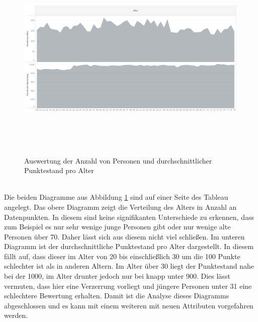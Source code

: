 \begin{onehalfspace}
\begin{figure}[h]
    \centering
    \includegraphics[width=16cm,height=10cm]{Diagramme/Tab_Point2.PNG}
    \caption{Auswertung der Anzahl von Personen und durchschnittlicher Punktestand pro Alter}
    \label{fig:TabPoint2}
\end{figure}\\
Die beiden Diagramme aus Abbildung \ref{fig:TabPoint2} sind auf einer Seite des Tableau angelegt. Das obere Diagramm zeigt die Verteilung des Alters in Anzahl an Datenpunkten. In diesem sind keine signifikanten Unterschiede zu erkennen, dass zum Beispiel es nur sehr wenige junge Personen gibt oder nur wenige alte Personen über 70. Daher lässt sich aus diesem nicht viel schließen. Im unteren Diagramm ist der durchschnittliche Punktestand pro Alter dargestellt. In diesem fällt auf, dass dieser im Alter von 20 bis einschließlich 30 um die 100 Punkte schlechter ist als in anderen Altern. Im Alter über 30 liegt der Punktestand nahe bei der 1000, im Alter drunter jedoch nur bei knapp unter 900. Dies lässt vermuten, dass hier eine Verzerrung vorliegt und jüngere Personen unter 31 eine schlechtere Bewertung erhalten. Damit ist die Analyse dieses Diagramms abgeschlossen und es kann mit einem weiteren mit neuen Attributen vorgefahren werden.\\

\end{onehalfspace}
